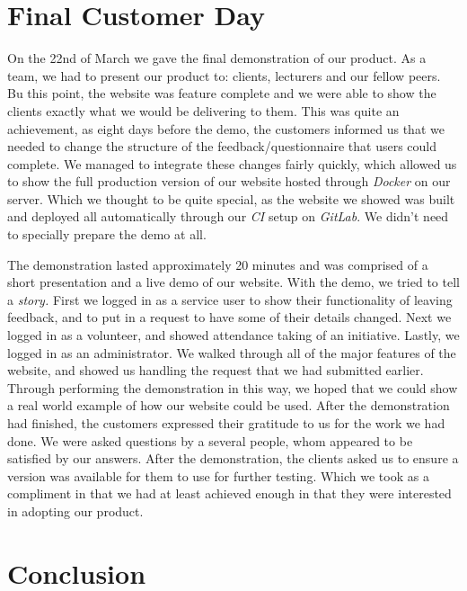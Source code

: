 \documentclass{l3proj}
\begin{document}
\section{Final Customer Day}
\label{sec:finalDay}

On the 22nd of March we gave the final demonstration of our product. As a team, we had to present our product to: clients, lecturers and our fellow peers. Bu this point, the website was feature complete and we were able to show the clients exactly what we would be delivering to them. This was quite an achievement, as eight days before the demo, the customers informed us that we needed to change the structure of the feedback/questionnaire that users could complete. We managed to integrate these changes fairly quickly, which allowed us to show the full production version of our website hosted through \textit{Docker} on our server. Which we thought to be quite special, as the website we showed was built and deployed all automatically through our \textit{CI} setup on \textit{GitLab}. We didn't need to specially prepare the demo at all.

The demonstration lasted approximately 20 minutes and was comprised of a short presentation and a live demo of our website. With the demo, we tried to tell a \textit{story.} First we logged in as a service user to show their functionality of leaving feedback, and to put in a request to have some of their details changed. Next we logged in as a volunteer, and showed attendance taking of an initiative. Lastly, we logged in as an administrator. We walked through all of the major features of the website, and showed us handling the request that we had submitted earlier. Through performing the demonstration in this way, we hoped that we could show a real world example of how our website could be used. After the demonstration had finished, the customers expressed their gratitude to us for the work we had done. We were asked questions by a several people, whom appeared to be satisfied by our answers. After the demonstration, the clients asked us to ensure a version was available for them to use for further testing. Which we took as a compliment in that we had at least achieved enough in that they were interested in adopting our product.

\section{Conclusion}
\end{document}
